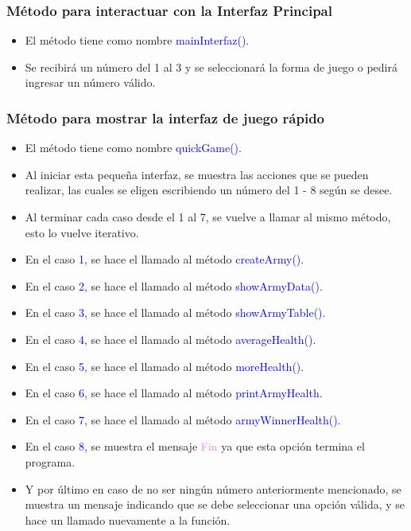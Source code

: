 \documentclass{article}
\begin{document}
\subsubsection{Método para interactuar con la Interfaz Principal}
\begin{itemize}
    \item El método tiene como nombre \textcolor{blue}{mainInterfaz()}.
    \item Se recibirá un número del 1 al 3 y se seleccionará la forma de juego o pedirá ingresar un número válido.
\end{itemize}



\newpage

\subsubsection{Método para mostrar la interfaz de juego rápido}
\begin{itemize}
    \item El método tiene como nombre \textcolor{blue}{quickGame()}.
    \item Al iniciar esta pequeña interfaz, se muestra las acciones que se pueden realizar, las cuales se eligen escribiendo un número del 1 - 8 según se desee.
    \item Al terminar cada caso desde el 1 al 7, se vuelve a llamar al mismo método, esto lo vuelve iterativo.
    \item En el caso \textcolor{blue}{1}, se hace el llamado al método \textcolor{blue}{createArmy()}.
    \item En el caso \textcolor{blue}{2}, se hace el llamado al método \textcolor{blue}{showArmyData()}.
    \item En el caso \textcolor{blue}{3}, se hace el llamado al método \textcolor{blue}{showArmyTable()}.
    \item En el caso \textcolor{blue}{4}, se hace el llamado al método \textcolor{blue}{averageHealth()}.
    \item En el caso \textcolor{blue}{5}, se hace el llamado al método \textcolor{blue}{moreHealth()}.
    \item En el caso \textcolor{blue}{6}, se hace el llamado al método \textcolor{blue}{printArmyHealth}.
    \item En el caso \textcolor{blue}{7}, se hace el llamado al método \textcolor{blue}{armyWinnerHealth()}.
    \item En el caso \textcolor{blue}{8}, se muestra el mensaje \textcolor{violet}{Fin} ya que esta opción termina el programa.
    \item Y por último en caso de no ser ningún número anteriormente mencionado, se muestra un mensaje indicando que se debe seleccionar una opción válida, y se hace un llamado nuevamente a la función.
\end{itemize}

\end{document}
